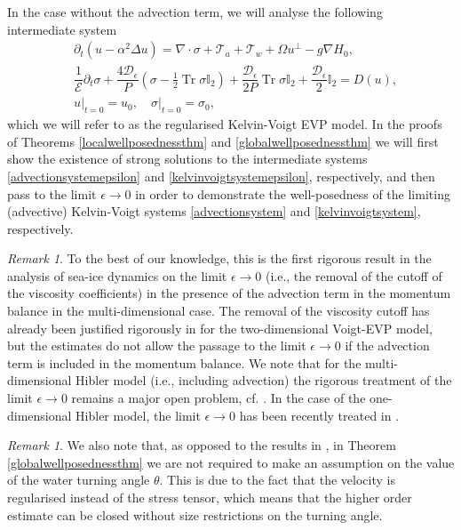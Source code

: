 \documentclass[12pt,a4paper]{article}
\theoremstyle{definition}
\theoremstyle{remark}
\newtheorem{remark}[theorem]{Remark}
\numberwithin{equation}{section}
\DeclareMathOperator{\Tr}{Tr}
\begin{document}
In the case without the advection term, we will analyse the following intermediate system
\begin{subequations} \label{kelvinvoigtsystemepsilon}
\begin{align}
&\partial_t (u - \alpha^2 \Delta u) = \nabla \cdot \sigma + \mathcal{T}_a + \mathcal{T}_w + \Omega u^\perp - g \nabla H_0, \label{kelvinvoigt1epsilon} \\
&\dfrac{1}{\mathcal E} \partial_t \sigma + \dfrac{4 \mathcal{D}_\epsilon}{P} (\sigma - \frac{1}{2} \Tr \sigma \mathbb I_2) + \dfrac{\mathcal{D}_\epsilon}{2P} \Tr \sigma \mathbb I_2 + \dfrac{\mathcal{D}_\epsilon}{2} \mathbb I_2  = D(u), \label{kelvinvoigt2epsilon}
	\\
&u \lvert_{t = 0} = u_0, \quad \sigma \lvert_{t = 0} = \sigma_0, \label{kelvinvoigt3epsilon}
\end{align}
\end{subequations}
which we will refer to as the regularised Kelvin-Voigt EVP model. In the proofs of Theorems \ref{localwellposednessthm} and \ref{globalwellposednessthm} we will first show the existence of strong solutions to the intermediate systems \eqref{advectionsystemepsilon} and \eqref{kelvinvoigtsystemepsilon}, respectively, and then pass to the limit $\epsilon \rightarrow 0$ in order to demonstrate the well-posedness of the limiting (advective) Kelvin-Voigt systems \eqref{advectionsystem} and \eqref{kelvinvoigtsystem}, respectively.
\begin{remark}
To the best of our knowledge, this is the first rigorous result in the analysis of sea-ice dynamics on the limit $\epsilon \rightarrow 0$ (i.e., the removal of the cutoff of the viscosity coefficients) in the presence of the advection term in the momentum balance in the multi-dimensional case. The removal of the viscosity cutoff has already been justified rigorously in \cite{boutros2025} for the two-dimensional Voigt-EVP model, but the estimates do not allow the passage to the limit $\epsilon \rightarrow 0$ if the advection term is included in the momentum balance. We note that for the multi-dimensional Hibler model (i.e., including advection) the rigorous treatment of the limit $\epsilon \rightarrow 0$ remains a major open problem, cf. \cite{liu}. In the case of the one-dimensional Hibler model, the limit $\epsilon \rightarrow 0$ has been recently treated in \cite{liu2026}.
\end{remark}
\begin{remark}
We also note that, as opposed to the results in \cite[Theorem 1.2]{boutros2025}, in Theorem \ref{globalwellposednessthm} we are not required to make an assumption on the value of the water turning angle $\theta$. This is due to the fact that the velocity is regularised instead of the stress tensor, which means that the higher order estimate can be closed without size restrictions on the turning angle.
\end{remark}
\end{document}
